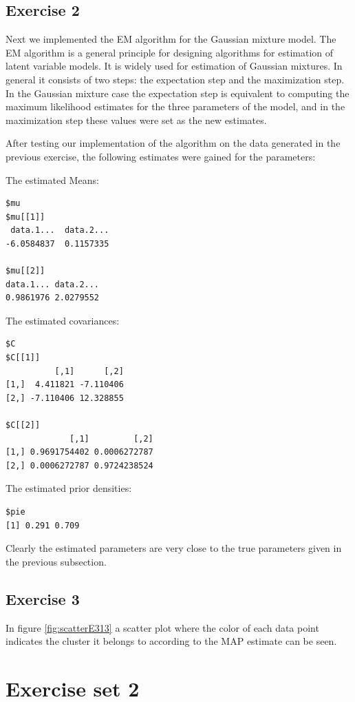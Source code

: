 \documentclass{article}
\begin{document}
\subsection{Exercise 2}
Next we implemented the EM algorithm for the Gaussian mixture
model. The EM algorithm is a general principle for designing
algorithms for estimation of latent variable models. It is widely used
for estimation of Gaussian mixtures. In general it consists of two
steps: the expectation step and the maximization step. In the Gaussian
mixture case the expectation step is equivalent to computing the
maximum likelihood estimates for the three parameters of the model,
and in the maximization step these values were set as the new
estimates.

After testing our implementation of the algorithm on the data generated in the previous
exercise, the following estimates were gained for the parameters:

\noindent The estimated Means:
\begin{verbatim}
$mu
$mu[[1]]
 data.1...  data.2... 
-6.0584837  0.1157335 

$mu[[2]]
data.1... data.2... 
0.9861976 2.0279552 
\end{verbatim}

\noindent The estimated covariances:
\begin{verbatim}
$C
$C[[1]]
          [,1]      [,2]
[1,]  4.411821 -7.110406
[2,] -7.110406 12.328855

$C[[2]]
             [,1]         [,2]
[1,] 0.9691754402 0.0006272787
[2,] 0.0006272787 0.9724238524
\end{verbatim}

\noindent The estimated prior densities:
\begin{verbatim}
$pie
[1] 0.291 0.709
\end{verbatim}

Clearly the estimated parameters are very close to the true parameters
given in the previous subsection.

\subsection{Exercise 3}

In figure \ref{fig:scatterE313} a scatter plot where the color of each data
point indicates the cluster it belongs to according to the MAP
estimate can be seen.


\section{Exercise set 2}
\end{document}
